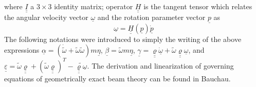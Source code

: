 \documentclass{aiaa-tc}
\newcommand{\tens}[1]{\underline{\underline{#1}}}
\renewcommand{\vec}[1]{\underline{#1}}
\begin{document}
where $\tens{I}$ a $3 \times 3$ identity matrix; operator $\tens{H}$ is the tangent tensor which relates the angular velocity vector $\vec{\omega}$ and the rotation parameter vector $\vec{p}$ as
\begin{equation}
	\label{operatorH}
	\vec{\omega} = \tens{H}(\vec{p}) \dot{\vec{p}}
\end{equation}
The following notations were introduced to simply the writing of the above expressions $\vec{\alpha} = (\dot{\tilde{\omega}} + \tilde{\omega} \tilde{\omega} ) m \vec{\eta}$, $\vec{\beta} = \tilde{\omega} m \vec{\eta}$, $\vec{\gamma} = \tens{\varrho} \dot{\vec{\omega}} + \tilde{\omega} \tens{\varrho} \vec{\omega}$, and $\tens{\varepsilon} = \tilde{\omega} \tens{\varrho} + (\tilde{\omega} \tens{\varrho})^T - \widetilde{\tens{\varrho} \vec{\omega}}$.   
The derivation and linearization of governing equations of geometrically exact beam theory can be found in Bauchau\cite{Bauchau:2010}.
\end{document}
